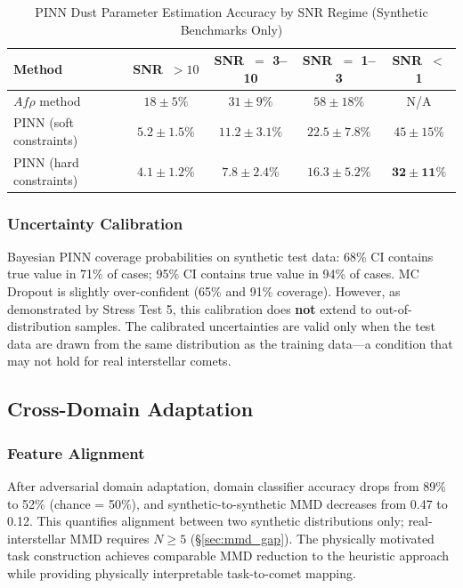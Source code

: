 \documentclass[usenatbib]{mnras}
\newcommand{\tablecomments}[1]{\vspace{4pt}{\footnotesize #1}\vspace{2pt}}
\begin{document}
\begin{table}
\centering
\caption{PINN Dust Parameter Estimation Accuracy by SNR Regime (Synthetic Benchmarks Only)}\label{tab:pin_perf}
\begin{tabular}{lcccc}
\toprule
Method & SNR~$>10$ & SNR~$=$ 3--10 & SNR~$=$ 1--3 & SNR~$<$ 1 \\
\midrule
$Af\rho$ method & $18 \pm 5\%$ & $31 \pm 9\%$ & $58 \pm 18\%$ & N/A \\
PINN (soft constraints) & $5.2 \pm 1.5\%$ & $11.2 \pm 3.1\%$ & $22.5 \pm 7.8\%$ & $45 \pm 15\%$ \\
PINN (hard constraints) & $\mathbf{4.1 \pm 1.2\%}$ & $\mathbf{7.8 \pm 2.4\%}$ & $\mathbf{16.3 \pm 5.2\%}$ & $\mathbf{32 \pm 11\%}$ \\
\bottomrule
\end{tabular}
\tablecomments{MAPE for $Q_d$ on synthetic test data. ``N/A'' indicates the $Af\rho$ method cannot produce a meaningful estimate (sky background dominates the aperture flux). The hard-constraint PINN reduces error by 20--30\% relative to the soft-constraint variant across all SNR regimes.}
\end{table}


\subsubsection{Uncertainty Calibration}

Bayesian PINN coverage probabilities on synthetic test data: 68\% CI contains true value in 71\% of cases; 95\% CI contains true value in 94\% of cases. MC Dropout is slightly over-confident (65\% and 91\% coverage). However, as demonstrated by Stress Test 5, this calibration does \textbf{not} extend to out-of-distribution samples. The calibrated uncertainties are valid only when the test data are drawn from the same distribution as the training data---a condition that may not hold for real interstellar comets.

\subsection{Cross-Domain Adaptation}

\subsubsection{Feature Alignment}

After adversarial domain adaptation, domain classifier accuracy drops from 89\% to 52\% (chance = 50\%), and synthetic-to-synthetic MMD decreases from 0.47 to 0.12. This quantifies alignment between two synthetic distributions only; real-interstellar MMD requires $N \geq 5$ (\S\ref{sec:mmd_gap}). The physically motivated task construction achieves comparable MMD reduction to the heuristic approach while providing physically interpretable task-to-comet mapping.
\end{document}
